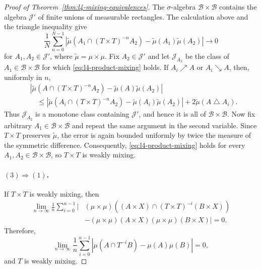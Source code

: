 \documentclass[11pt,a4paper]{article}
\begin{document}
\begin{proof}[Proof of Theorem~\ref{thm:l4-mixing-equivalences}]
The $\sigma$-algebra $\mathcal B\times\mathcal B$ contains the algebra
$\mathcal J'$ of finite unions of measurable rectangles. The calculation
above and the triangle inequality give
\[
 \frac1N\sum_{n=0}^{N-1}
 \left|\widetilde\mu(A_1\cap(T\times T)^{-n}A_2)
 -\widetilde\mu(A_1)\widetilde\mu(A_2)\right|\longrightarrow0
 \tag{$\dagger$}\label{eq:l4-product-mixing}
\]
for $A_1,A_2\in\mathcal J'$, where $\widetilde\mu=\mu\times\mu$.
Fix $A_2\in\mathcal J'$ and let $\mathcal J_{A_2}$ be the class of
$A_1\in\mathcal B\times\mathcal B$ for which
\eqref{eq:l4-product-mixing} holds. If $A_i\nearrow A$ or $A_i\searrow A$,
then, uniformly in $n$,
\[
 \begin{aligned}
 &\left|\widetilde\mu(A\cap(T\times T)^{-n}A_2)
 -\widetilde\mu(A)\widetilde\mu(A_2)\right|\\
 &\quad\leq
 \left|\widetilde\mu(A_i\cap(T\times T)^{-n}A_2)
 -\widetilde\mu(A_i)\widetilde\mu(A_2)\right|
 +2\widetilde\mu(A\mathbin\triangle A_i).
 \end{aligned}
\]
Thus $\mathcal J_{A_2}$ is a monotone class containing $\mathcal J'$, and
hence it is all of $\mathcal B\times\mathcal B$. Now fix arbitrary
$A_1\in\mathcal B\times\mathcal B$ and repeat the same argument in the
second variable. Since $T\times T$ preserves $\widetilde\mu$, the error is
again bounded uniformly by twice the measure of the symmetric difference.
Consequently, \eqref{eq:l4-product-mixing} holds for every
$A_1,A_2\in\mathcal B\times\mathcal B$, so $T\times T$ is weakly mixing.


\paragraph{$(3)\Longrightarrow(1)$.}
If $T\times T$ is weakly mixing, then
\[
 \begin{aligned}
 \lim_{n\to\infty}\frac1n\sum_{i=0}^{n-1}
 \bigl|&(\mu\times\mu)((A\times X)\cap(T\times T)^{-i}(B\times X))\\
 &-(\mu\times\mu)(A\times X)(\mu\times\mu)(B\times X)\bigr|=0.
 \end{aligned}
\]
Therefore,
\[
 \lim_{n\to\infty}\frac1n\sum_{i=0}^{n-1}
 |\mu(A\cap T^{-i}B)-\mu(A)\mu(B)|=0,
\]
and $T$ is weakly mixing.


\end{proof}
\end{document}
